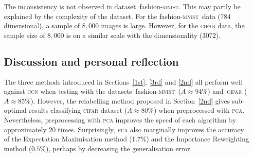 \documentclass[12pt]{article} %
\newcommand{\mnist}{fashion-\textsc{mnist}}
\begin{document}
The inconsistency is not observed in dataset~\mnist. This may partly be explained by the complexity of the dataset. For the \mnist\ data ($784$ dimensional), a sample of $8,000$ images is large. However, for the \textsc{cifar} data, the sample size of $8,000$ is on a similar scale with the dimensionality ($3072$).






\subsection{Discussion and personal reflection}




The three methods introduced in Sections~\ref{1st}, \ref{3rd} and \ref{2nd}  all perform well against \textsc{ccn} when testing with the datasets~\mnist\ ($A\approx 94\%$) and~\textsc{cifar} ($A\approx 85\%$). However, the relabelling method proposed in Section~\ref{2nd} gives sub-optimal  results classifying \textsc{cifar} dataset ($A\approx 80\%$) when preprocessed with \textsc{pca}. Nevertheless, preprocessing with \textsc{pca} improves the speed of each algorithm by approximately 20 times. Surprisingly, \textsc{pca} also marginally improves the accuracy of the Expectation Maximisation method ($1.7\%$) and the Importance Reweighting method ($0.5\%$), perhaps by decreasing the generalisation error.
\end{document}
